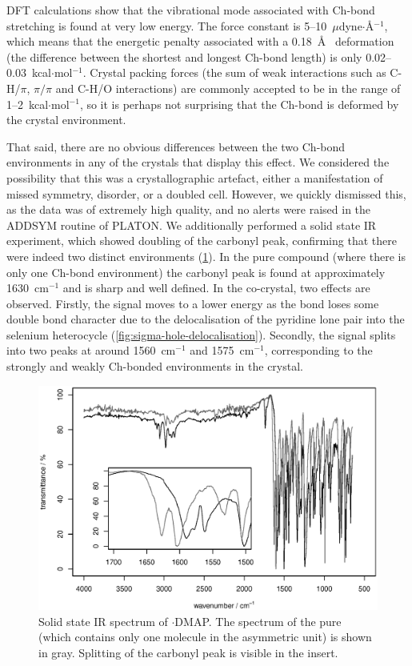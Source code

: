 DFT calculations show that the vibrational mode associated with Ch-bond stretching is found at very low energy.
The force constant is 5--10~$\mu$dyne$\cdot$\AA$^{-1}$, which means that the energetic penalty associated with a 0.18~\AA~ deformation (the difference between the shortest and longest Ch-bond length) is only 0.02--0.03~kcal$\cdot$mol$^{-1}$.
Crystal packing forces (the sum of weak interactions such as C-H/$\pi$, $\pi /\pi$ and C-H/O interactions) are commonly accepted to be in the range of 1--2~kcal$\cdot$mol$^{-1}$, so it is perhaps not surprising that the Ch-bond is deformed by the crystal environment.\autocite{Dunitz1988}

That said, there are no obvious differences between the two Ch-bond environments in any of the crystals that display this effect.
We considered the possibility that this was a crystallographic artefact, either a manifestation of missed symmetry, disorder, or a doubled cell.
However, we quickly dismissed this, as the data was of extremely high quality, and no alerts were raised in the ADDSYM routine of PLATON.
We additionally performed a solid state IR experiment, which showed doubling of the carbonyl peak, confirming that there were indeed two distinct environments (\ref{fig:ebs-4oet-dmap-ir}).
In the pure compound (where there is only one Ch-bond environment) the carbonyl peak is found at approximately 1630~cm$^{-1}$ and is sharp and well defined.
In the co-crystal, two effects are observed.
Firstly, the signal moves to a lower energy as the  bond loses some double bond character due to the delocalisation of the pyridine lone pair into the selenium heterocycle (\ref{fig:sigma-hole-delocalisation}).
Secondly, the signal splits into two peaks at around 1560~cm$^{-1}$ and 1575~cm$^{-1}$, corresponding to the strongly and weakly Ch-bonded environments in the crystal.

\begin{figure}
    \centering
    \includegraphics[width=\linewidth]{Figures/ebs-4oet-dmap-ir.eps}
    \caption{Solid state IR spectrum of $\cdot$DMAP. The spectrum of the pure  (which contains only one molecule in the asymmetric unit) is shown in gray. Splitting of the carbonyl peak is visible in the insert.}
    \label{fig:ebs-4oet-dmap-ir}
\end{figure}

